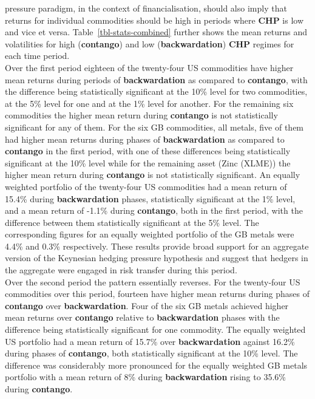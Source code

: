 \documentclass[
  authoryear,
  preprint,
  3p]{elsarticle}
\begin{document}
pressure paradigm, in the context of financialisation, should also imply
that returns for individual commodities should be high in periods where
\textbf{CHP} is low and vice et versa. Table~\ref{tbl-stats-combined}
further shows the mean returns and volatilities for high
(\textbf{contango}) and low (\textbf{backwardation}) \textbf{CHP}
regimes for each time period.\\
Over the first period eighteen of the twenty-four US commodities have
higher mean returns during periods of \textbf{backwardation} as compared
to \textbf{contango}, with the difference being statistically
significant at the 10\% level for two commodities, at the 5\% level for
one and at the 1\% level for another. For the remaining six commodities
the higher mean return during \textbf{contango} is not statistically
significant for any of them. For the six GB commodities, all metals,
five of them had higher mean returns during phases of
\textbf{backwardation} as compared to \textbf{contango} in the first
period, with one of these differences being statistically significant at
the 10\% level while for the remaining asset (Zinc (XLME)) the higher
mean return during \textbf{contango} is not statistically significant.
An equally weighted portfolio of the twenty-four US commodities had a
mean return of 15.4\% during \textbf{backwardation} phases,
statistically significant at the 1\% level, and a mean return of -1.1\%
during \textbf{contango}, both in the first period, with the difference
between them statistically significant at the 5\% level. The
corresponding figures for an equally weighted portfolio of the GB metals
were 4.4\% and 0.3\% respectively. These results provide broad support
for an aggregate version of the Keynesian hedging pressure hypothesis
and suggest that hedgers in the aggregate were engaged in risk transfer
during this period.\\
Over the second period the pattern essentially reverses. For the
twenty-four US commodities over this period, fourteen have higher mean
returns during phases of \textbf{contango} over \textbf{backwardation}.
Four of the six GB metals achieved higher mean returns over
\textbf{contango} relative to \textbf{backwardation} phases with the
difference being statistically significant for one commodity. The
equally weighted US portfolio had a mean return of 15.7\% over
\textbf{backwardation} against 16.2\% during phases of
\textbf{contango}, both statistically significant at the 10\% level. The
difference was considerably more pronounced for the equally weighted GB
metals portfolio with a mean return of 8\% during \textbf{backwardation}
rising to 35.6\% during \textbf{contango}.
\end{document}
